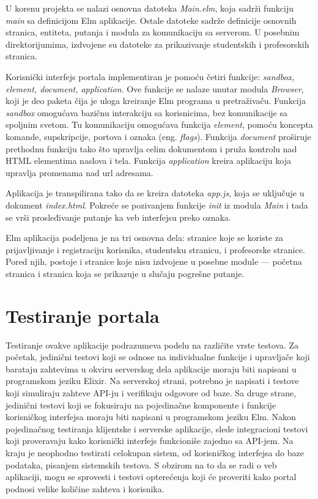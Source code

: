 \documentclass[12pt,oneside]{memoir}
\begin{document}
\par U korenu projekta se nalazi osnovna datoteka \emph{Main.elm}, koja sadrži funkciju \emph{main} sa definicijom Elm aplikacije. Ostale datoteke sadrže definicije osnovnih stranica, entiteta, putanja i modula za komunikaciju sa serverom. U posebnim direktorijumima, izdvojene su datoteke za prikazivanje studentskih i profesorskih stranica. 
\par Korisnički interfejs portala implementiran je pomoću četiri funkcije: \emph{sandbox, element, document, application}. Ove funkcije se nalaze unutar modula \emph{Browser}, koji je deo paketa čija je uloga kreiranje Elm programa u pretraživaču. Funkcija \emph{sandbox} omogućava bazičnu interakciju sa korisnicima, bez komunikacije sa spoljnim svetom. Tu komunikaciju omogućava funkcija \emph{element}, pomoću koncepta komande, supskripcije, portova i oznaka (eng. \emph{flags}). Funkcija \emph{document} proširuje prethodnu funkciju tako što upravlja celim dokumentom i pruža kontrolu nad HTML elementima naslova i tela. Funkcija \emph{application} kreira aplikaciju koja upravlja promenama nad url adresama. 
\par Aplikacija je transpilirana tako da se kreira datoteka \emph{app.js}, koja se uključuje u dokument \emph{index.html}. Pokreće se pozivanjem funkcije \emph{init} iz modula \emph{Main} i tada se vrši prosleđivanje putanje ka veb interfejsu preko oznaka. 
\par Elm aplikacija podeljena je na tri osnovna dela: stranice koje se koriste za prijavljivanje i registraciju korisnika, studentsku stranicu, i profesorske stranice. Pored njih, postoje i stranice koje nisu izdvojene u posebne module --- početna stranica i stranica koja se prikazuje u slučaju pogrešne putanje.


\section{Testiranje portala}
\par Testiranje ovakve aplikacije podrazumeva podelu na različite vrste testova. Za početak, jedinični testovi koji se odnose na individualne funkcije i upravljače koji barataju zahtevima u okviru serverskog dela aplikacije moraju biti napisani u programskom jeziku Elixir. Na serverskoj strani, potrebno je napisati i testove koji simuliraju zahteve API-ju i verifikuju odgovore od baze. Sa druge strane, jedinični testovi koji se fokusiraju na pojedinačne komponente i funkcije korisničkog interfejsa moraju biti napisani u programskom jeziku Elm. Nakon pojedinačnog testiranja klijentske i serverske aplikacije, slede integracioni testovi koji proveravaju kako korisnički interfejs funkcioniše zajedno sa API-jem. Na kraju je neophodno testirati celokupan sistem, od korisničkog interfejsa do baze podataka, pisanjem sistemskih testova. S obzirom na to da se radi o veb aplikaciji, mogu se sprovesti i testovi opterećenja koji će proveriti kako portal podnosi velike količine zahteva i korisnika. 
\end{document}
